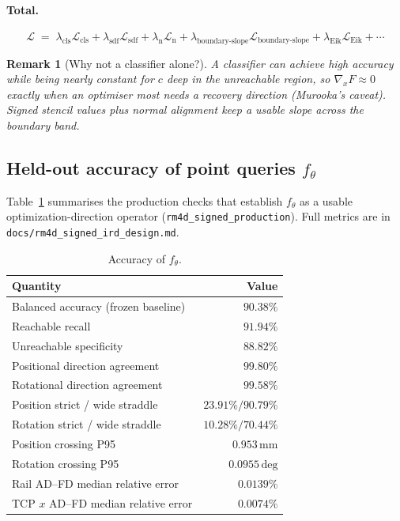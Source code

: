 \documentclass[11pt,a4paper]{article}
\newtheorem{remark}{Remark}
\begin{document}
\paragraph{Total.}
\begin{equation}
\label{eq:loss-total}
  \mathcal{L}
  \;=\;
  \lambda_{\mathrm{cls}}\mathcal{L}_{\mathrm{cls}}
  +
  \lambda_{\mathrm{sdf}}\mathcal{L}_{\mathrm{sdf}}
  +
  \lambda_{\mathrm{n}}\mathcal{L}_{\mathrm{n}}
  +
  \lambda_{\mathrm{boundary\text{-}slope}}\mathcal{L}_{\mathrm{boundary\text{-}slope}}
  +
  \lambda_{\mathrm{Eik}}\mathcal{L}_{\mathrm{Eik}}
  +
  \cdots
\end{equation}

\begin{remark}[Why not a classifier alone?]
A classifier can achieve high accuracy while being nearly constant for
\(c\) deep in the unreachable region, so \(\nabla_{x}F\approx 0\) exactly
when an optimiser most needs a recovery direction (Murooka's caveat). Signed
stencil values plus normal alignment keep a usable slope across the boundary
band.
\end{remark}

\subsection{Held-out accuracy of point queries \(f_{\theta}\)}
\label{sec:field-accuracy}

Table~\ref{tab:f-usable} summarises the production checks that establish
\(f_{\theta}\) as a usable optimization-direction operator
(\texttt{rm4d\_signed\_production}). Full metrics are in
\texttt{docs/rm4d\_signed\_ird\_design.md}.

\begin{table}[ht]
\centering
\caption{Accuracy of \(f_{\theta}\).}
\label{tab:f-usable}
\begin{tabular}{@{}l r@{}}
\hline\hline
Quantity & Value \\
\hline
Balanced accuracy (frozen baseline) & \(90.38\%\) \\
Reachable recall & \(91.94\%\) \\
Unreachable specificity & \(88.82\%\) \\
Positional direction agreement & \(99.80\%\) \\
Rotational direction agreement & \(99.58\%\) \\
Position strict / wide straddle & \(23.91\% / 90.79\%\) \\
Rotation strict / wide straddle & \(10.28\% / 70.44\%\) \\
Position crossing P95 & \(0.953\,\mathrm{mm}\) \\
Rotation crossing P95 & \(0.0955\,\mathrm{deg}\) \\
Rail AD--FD median relative error & \(0.0139\%\) \\
TCP \(x\) AD--FD median relative error & \(0.0074\%\) \\
\hline\hline
\end{tabular}
\end{table}
\end{document}
